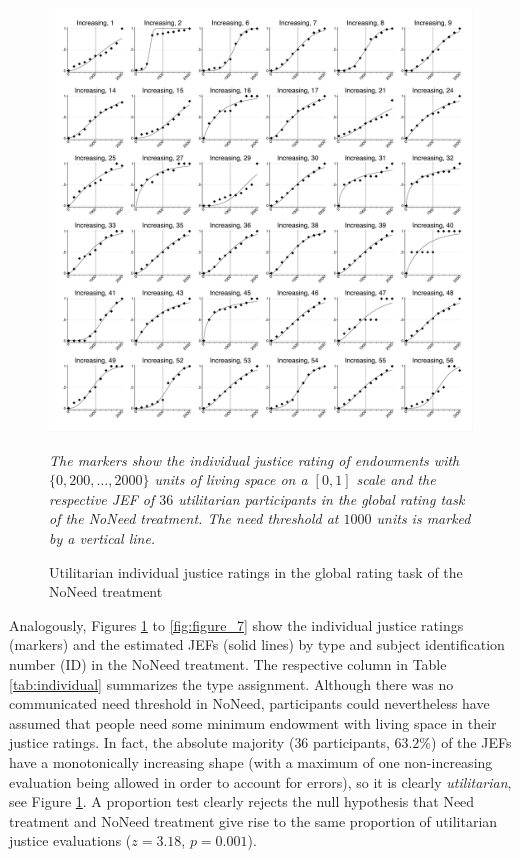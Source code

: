 \documentclass[12pt]{scrartcl}
\begin{document}
\begin{figure}[h!t!]
   \centering
   \includegraphics[width=\linewidth]{figures/figure_5.pdf}
   \begin{minipage}{\linewidth}
      \footnotesize
      \textit{The markers show the individual justice rating of endowments with $\{0,200,\ldots,2000\}$ units of living space on a $[0,1]$ scale and the respective JEF of $36$ utilitarian participants in the global rating task of the NoNeed treatment. The need threshold at $1000$ units is marked by a vertical line.}
   \end{minipage}
   \caption{Utilitarian individual justice ratings in the global rating task of the NoNeed treatment}\label{fig:figure_5}
\end{figure}

Analogously, Figures \ref{fig:figure_5} to \ref{fig:figure_7} show the individual justice ratings (markers) and the estimated JEFs (solid lines) by type and subject identification number (ID) in the NoNeed treatment.
The respective column in Table \ref{tab:individual} summarizes the type assignment.
Although there was no communicated need threshold in NoNeed, participants could nevertheless have assumed that people need some minimum endowment with living space in their justice ratings.
In fact, the absolute majority ($36$ participants, $63.2\%$) of the JEFs have a monotonically increasing shape (with a maximum of one non-increasing evaluation being allowed in order to account for errors), so it is clearly \textit{utilitarian}, see Figure \ref{fig:figure_5}.
A proportion test clearly rejects the null hypothesis that Need treatment and NoNeed treatment give rise to the same proportion of utilitarian justice evaluations ($z=3.18$, $p=0.001$).
\end{document}
